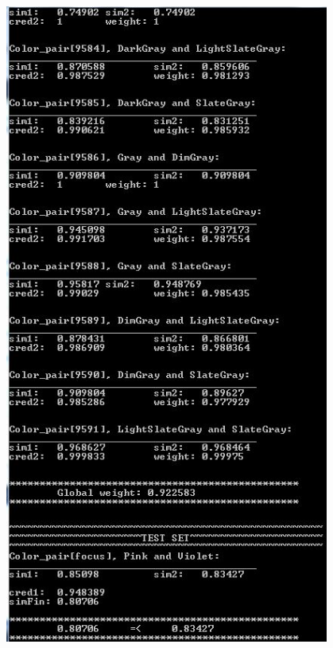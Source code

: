 \documentclass[egilmezThesis.tex]{subfiles}
\begin{document}
\newpage
\begin{center}
\label{The average rule is utilized}
\includegraphics[width=0.8\textwidth]{3.jpg}
\end{center}

\end{document}
